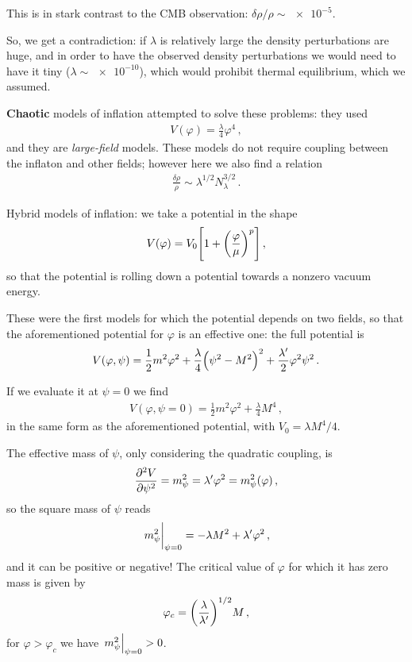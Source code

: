 \documentclass[main.tex]{subfiles}
\begin{document}
This is in stark contrast to the CMB observation: \(\delta \rho /\rho \sim \num{e-5}\). 

So, we get a contradiction: if \(\lambda \) is relatively large the density perturbations are huge, and in order to have the observed density perturbations we would need to have it tiny (\(\lambda \sim \num{e-10}\)), which would prohibit thermal equilibrium, which we assumed. 

\textbf{Chaotic} models of inflation attempted to solve these problems: they used 
%
\begin{align}
V(\varphi ) = \frac{\lambda}{4} \varphi^{4}
\,,
\end{align}
%
and they are \emph{large-field} models. 
These models do not require coupling between the inflaton and other fields; however here we also find a relation 
%
\begin{align}
\frac{ \delta \rho }{\rho } \sim \lambda^{1/2} N_\lambda^{3/2}
\,.
\end{align}


Hybrid models of inflation: we take a potential in the shape 
%
\begin{align}
V(\varphi ) = V_0 \qty[1 + \qty(\frac{\varphi }{\mu })^{p}]
\,,
\end{align}
%
so that the potential is rolling down a potential towards a nonzero vacuum energy. 

These were the first models for which the potential depends on two fields, so that the aforementioned potential for \(\varphi \) is an effective one: the full potential is 
%
\begin{align}
V(\varphi , \psi ) = \frac{1}{2} m^2\varphi^2+ \frac{\lambda}{4} \qty(\psi^2-M^2)^2 + \frac{\lambda'}{2} \varphi^2 \psi^2
\,.
\end{align}

If we evaluate it at \(\psi = 0\) we find 
%
\begin{align}
V(\varphi , \psi = 0) = \frac{1}{2} m^2\varphi^2 + \frac{\lambda}{4} M^{4}
\,,
\end{align}
%
in the same form as the aforementioned potential, with \(V_0 = \lambda M^{4} /4\). 

The effective mass of \(\psi \), only considering the quadratic coupling, is
%
\begin{align}
\pdv[2]{V}{\psi } = m^2_\psi = \lambda ' \varphi^2 = m^2_\psi (\varphi )
\,,
\end{align}
%
so the square mass of \(\psi \) reads 
%
\begin{align}
\eval{m^2_\psi}_{\psi = 0} = - \lambda  M^2 + \lambda ' \varphi^2
\,,
\end{align}
%
and it can be positive or negative! The critical value of \(\varphi \) for which it has zero mass is given by 
%
\begin{align}
\varphi _c = \qty( \frac{\lambda }{\lambda'})^{1/2} M
\,,
\end{align}
%
for \(\varphi > \varphi _c\) we have \(\eval{m^2_\psi }_{\psi = 0} > 0\).
\end{document}
